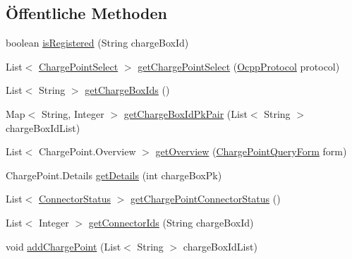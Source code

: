 \subsection*{Öffentliche Methoden}
\begin{DoxyCompactItemize}
\item 
boolean \hyperlink{interfacede_1_1rwth_1_1idsg_1_1steve_1_1repository_1_1_charge_point_repository_a4824062c6ff2dfcf9490ffb71484bb83}{is\+Registered} (String charge\+Box\+Id)
\item 
List$<$ \hyperlink{classde_1_1rwth_1_1idsg_1_1steve_1_1repository_1_1dto_1_1_charge_point_select}{Charge\+Point\+Select} $>$ \hyperlink{interfacede_1_1rwth_1_1idsg_1_1steve_1_1repository_1_1_charge_point_repository_ad8617028d70a274b51b9fe7d04feee72}{get\+Charge\+Point\+Select} (\hyperlink{enumde_1_1rwth_1_1idsg_1_1steve_1_1ocpp_1_1_ocpp_protocol}{Ocpp\+Protocol} protocol)
\item 
List$<$ String $>$ \hyperlink{interfacede_1_1rwth_1_1idsg_1_1steve_1_1repository_1_1_charge_point_repository_a0f9a9d616c82118e9292f1dd0bb8fd5e}{get\+Charge\+Box\+Ids} ()
\item 
Map$<$ String, Integer $>$ \hyperlink{interfacede_1_1rwth_1_1idsg_1_1steve_1_1repository_1_1_charge_point_repository_ac07b02af508e0e81d53c90802fca149f}{get\+Charge\+Box\+Id\+Pk\+Pair} (List$<$ String $>$ charge\+Box\+Id\+List)
\item 
List$<$ Charge\+Point.\+Overview $>$ \hyperlink{interfacede_1_1rwth_1_1idsg_1_1steve_1_1repository_1_1_charge_point_repository_ad9223548ece03ca151c916298b19be57}{get\+Overview} (\hyperlink{classde_1_1rwth_1_1idsg_1_1steve_1_1web_1_1dto_1_1_charge_point_query_form}{Charge\+Point\+Query\+Form} form)
\item 
Charge\+Point.\+Details \hyperlink{interfacede_1_1rwth_1_1idsg_1_1steve_1_1repository_1_1_charge_point_repository_a27364670868b5a47dd02b26f6b9e8058}{get\+Details} (int charge\+Box\+Pk)
\item 
List$<$ \hyperlink{classde_1_1rwth_1_1idsg_1_1steve_1_1repository_1_1dto_1_1_connector_status}{Connector\+Status} $>$ \hyperlink{interfacede_1_1rwth_1_1idsg_1_1steve_1_1repository_1_1_charge_point_repository_ab1beb661ec11861ebaf2e43b003cb6d8}{get\+Charge\+Point\+Connector\+Status} ()
\item 
List$<$ Integer $>$ \hyperlink{interfacede_1_1rwth_1_1idsg_1_1steve_1_1repository_1_1_charge_point_repository_aed97e9bbcfd11a66f6e86bc52e51cbd5}{get\+Connector\+Ids} (String charge\+Box\+Id)
\item 
void \hyperlink{interfacede_1_1rwth_1_1idsg_1_1steve_1_1repository_1_1_charge_point_repository_ad54534952ec931a42b250554ffca96a8}{add\+Charge\+Point} (List$<$ String $>$ charge\+Box\+Id\+List)

\end{DoxyCompactItemize}
